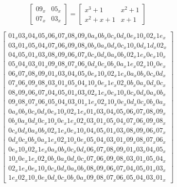 \begin{equation}\label{mat:singular-elcio}
    \begin{bmatrix}
    09_x & 05_x\\
    07_x & 03_x
    \end{bmatrix}
    =
    \begin{bmatrix}
    x^3+1 & x^2+1\\
    x^2 + x + 1 & x + 1
    \end{bmatrix}
\end{equation}

\begin{equation}\label{mat:elcio}
\begin{bmatrix}
01_x 03_x 04_x 05_x 06_x 07_x 08_x 09_x 0a_x 0b_x 0c_x 0d_x 0e_x 10_x 02_x 1e_x\\
03_x 01_x 05_x 04_x 07_x 06_x 09_x 08_x 0b_x 0a_x 0d_x 0c_x 10_x 0d_x 1d_x 02_x\\
04_x 05_x 01_x 03_x 08_x 09_x 06_x 07_x 0c_x 0d_x 0a_x 0b_x 02_x 1e_x 0e_x 10_x\\
05_x 04_x 03_x 01_x 09_x 08_x 07_x 06_x 0d_x 0c_x 0b_x 0a_x 1e_x 02_x 10_x 0e_x\\
06_x 07_x 08_x 09_x 01_x 03_x 04_x 05_x 0e_x 10_x 02_x 1e_x 0a_x 0b_x 0c_x 0d_x\\
07_x 06_x 09_x 08_x 03_x 01_x 05_x 04_x 10_x 0e_x 1e_x 02_x 0b_x 0a_x 0d_x 0c_x\\
08_x 09_x 06_x 07_x 04_x 05_x 01_x 03_x 02_x 1e_x 0e_x 10_x 0c_x 0d_x 0a_x 0b_x\\
09_x 08_x 07_x 06_x 05_x 04_x 03_x 01_x 1e_x 02_x 10_x 0e_x 0d_x 0c_x 0b_x 0a_x\\
0a_x 0b_x 0c_x 0d_x 0e_x 10_x 02_x 1e_x 01_x 03_x 04_x 05_x 06_x 07_x 08_x 09_x\\
0b_x 0a_x 0d_x 0c_x 10_x 0e_x 1e_x 02_x 03_x 01_x 05_x 04_x 07_x 06_x 09_x 08_x\\
0c_x 0d_x 0a_x 0b_x 02_x 1e_x 0e_x 10_x 04_x 05_x 01_x 03_x 08_x 09_x 06_x 07_x\\
0d_x 0c_x 0b_x 0a_x 1e_x 02_x 10_x 0e_x 05_x 04_x 03_x 01_x 09_x 08_x 07_x 06_x\\
0e_x 10_x 02_x 1e_x 0a_x 0b_x 0c_x 0d_x 06_x 07_x 08_x 09_x 01_x 03_x 04_x 05_x\\
10_x 0e_x 1e_x 02_x 0b_x 0a_x 0d_x 0c_x 07_x 06_x 09_x 08_x 03_x 01_x 05_x 04_x\\
02_x 1e_x 0e_x 10_x 0c_x 0d_x 0a_x 0b_x 08_x 09_x 06_x 07_x 04_x 05_x 01_x 03_x\\
1e_x 02_x 10_x 0e_x 0d_x 0c_x 0b_x 0a_x 09_x 08_x 07_x 06_x 05_x 04_x 03_x 01_x
\end{bmatrix}
\end{equation}
